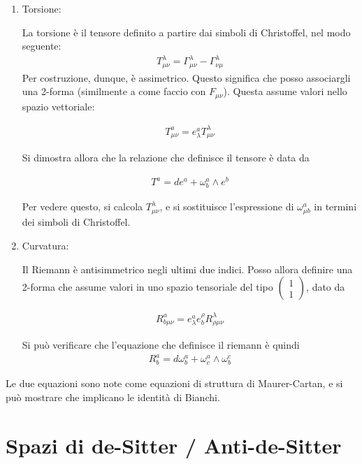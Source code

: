 \documentclass{report}
\begin{document}
\begin{enumerate}
    \item Torsione: 
    
    La torsione è il tensore definito a partire dai simboli di Christoffel, nel modo seguente: 
    \begin{align}
        T^\lambda_{\mu\nu} = \Gamma^\lambda_{\mu\nu} - \Gamma^\lambda_{\nu\mu}
    \end{align}
    Per costruzione, dunque, è assimetrico. Questo significa che posso associargli una 2-forma (similmente a come faccio con \(F_{\mu\nu}\)). Questa assume valori nello spazio vettoriale: 

    \begin{align}
        T^a_{\mu\nu} = e^a_\lambda T^\lambda_{\mu\nu}
    \end{align}

    Si dimostra allora che la relazione che definisce il tensore è data da 

    \begin{align}
        T^a = de^a + \omega^a_b \wedge e^b 
    \end{align}

    Per vedere questo, si calcola \(T^\lambda_{\mu\nu}\), e si sostituisce l'espressione di \(\omega^a_{\mu b}\) in termini dei simboli di Christoffel. 
    \item Curvatura: 
    
    Il Riemann è antisimmetrico negli ultimi due indici. Posso allora definire una 2-forma che assume valori in uno spazio tensoriale del tipo \(\begin{pmatrix}
        1 \\ 1
    \end{pmatrix}\), dato da 

    \begin{align}
        R^a_{b\mu\nu} = e^a_\lambda e^\rho_b R^\lambda_{\rho\mu\nu}
    \end{align}

    Si può verificare che l'equazione che definisce il riemann è quindi 
    \begin{align}
        R^a_b = d\omega^a_b + \omega^a_c \wedge \omega^c_b 
    \end{align}
\end{enumerate}

Le due equazioni sono note come equazioni di struttura di Maurer-Cartan, e si può mostrare che implicano le identità di Bianchi. 

\section{Spazi di de-Sitter / Anti-de-Sitter}
\end{document}
